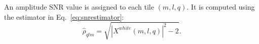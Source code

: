 
An amplitude SNR value is assigned to each tile $(m,l,q)$. It is computed using the estimator in Eq.~\ref{eq:snrestimator}:
\begin{equation}
  \hat{\rho}_{qlm} = \sqrt{ |X^{white}(m,l,q)|^2-2}.
\end{equation}

